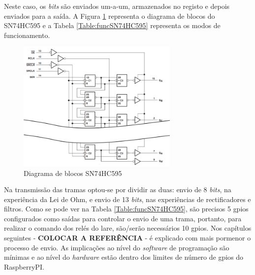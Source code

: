 Neste caso, os \textit{bits} são enviados um-a-um, armazenados no registo e depois enviados para a saída. A Figura \ref{fig:SN74HC595blocos} representa o diagrama de blocos do SN74HC595 e a Tabela \ref{Table:funcSN74HC595} representa os modos de funcionamento.

\begin{figure}[hbtp]
    \centering
    \includegraphics[width=0.7\textwidth]{figures/SR_blocos.png}
    \caption{Diagrama  de blocos SN74HC595 \cite{SN74HC595}}
    \label{fig:SN74HC595blocos}
\end{figure}

Na transmissão das tramas optou-se por dividir as duas: envio de 8 \textit{bits}, na experiência da Lei de Ohm, e envio de 13 \textit{bits}, nas experiências de rectificadores e filtros. Como se pode ver na Tabela \ref{Table:funcSN74HC595}, são precisos 5 \acrshort{gpio}s configurados como saídas para controlar o envio de uma trama, portanto, para realizar o comando dos relés do \acrshort{lare}, são/serão necessários 10 \acrshort{gpio}s.
Nos capítulos seguintes - \textbf{COLOCAR A REFERÊNCIA} - é explicado com mais pormenor o processo de envio. As implicações ao nível do \textit{software} de programação são mínimas e ao nível do \textit{hardware} estão dentro dos limites de número de \acrshort{gpio}s do \gls{RaspberryPI}.

